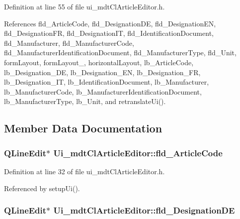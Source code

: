 Definition at line 55 of file ui\-\_\-mdt\-Cl\-Article\-Editor.\-h.



References fld\-\_\-\-Article\-Code, fld\-\_\-\-Designation\-D\-E, fld\-\_\-\-Designation\-E\-N, fld\-\_\-\-Designation\-F\-R, fld\-\_\-\-Designation\-I\-T, fld\-\_\-\-Identification\-Document, fld\-\_\-\-Manufacturer, fld\-\_\-\-Manufacturer\-Code, fld\-\_\-\-Manufacturer\-Identification\-Document, fld\-\_\-\-Manufacturer\-Type, fld\-\_\-\-Unit, form\-Layout, form\-Layout\-\_, horizontal\-Layout, lb\-\_\-\-Article\-Code, lb\-\_\-\-Designation\-\_\-\-D\-E, lb\-\_\-\-Designation\-\_\-\-E\-N, lb\-\_\-\-Designation\-\_\-\-F\-R, lb\-\_\-\-Designation\-\_\-\-I\-T, lb\-\_\-\-Identification\-Document, lb\-\_\-\-Manufacturer, lb\-\_\-\-Manufacturer\-Code, lb\-\_\-\-Manufacturer\-Identification\-Document, lb\-\_\-\-Manufacturer\-Type, lb\-\_\-\-Unit, and retranslate\-Ui().



\subsection{Member Data Documentation}
\hypertarget{class_ui__mdt_cl_article_editor_a1b8cbd2a6c1bc5746812b3d7376edb81}{
\subsubsection[{fld\-\_\-\-Article\-Code}]{\setlength{\rightskip}{0pt plus 5cm}Q\-Line\-Edit$\ast$ Ui\-\_\-mdt\-Cl\-Article\-Editor\-::fld\-\_\-\-Article\-Code}}\label{class_ui__mdt_cl_article_editor_a1b8cbd2a6c1bc5746812b3d7376edb81}


Definition at line 32 of file ui\-\_\-mdt\-Cl\-Article\-Editor.\-h.



Referenced by setup\-Ui().

\hypertarget{class_ui__mdt_cl_article_editor_acaa0b546f773c3d6b03d5289614055fb}{
\subsubsection[{fld\-\_\-\-Designation\-D\-E}]{\setlength{\rightskip}{0pt plus 5cm}Q\-Line\-Edit$\ast$ Ui\-\_\-mdt\-Cl\-Article\-Editor\-::fld\-\_\-\-Designation\-D\-E}}\label{class_ui__mdt_cl_article_editor_acaa0b546f773c3d6b03d5289614055fb}


